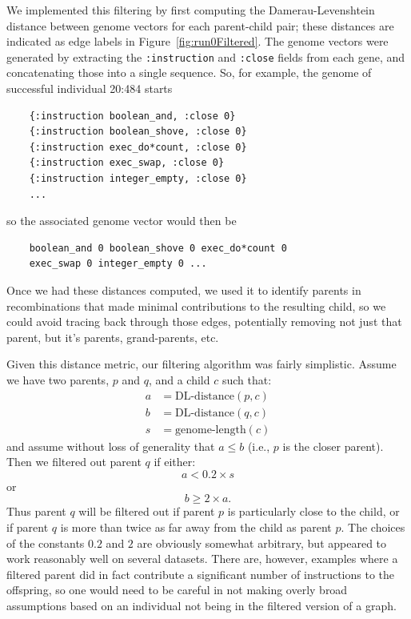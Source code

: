 We implemented this filtering by first computing the Damerau-Levenshtein 
distance between genome vectors for each parent-child pair; these distances
are indicated as edge labels in Figure~\ref{fig:run0Filtered}. The genome
vectors were generated by extracting the \texttt{:instruction} and 
\texttt{:close} fields from each gene, and concatenating those into a
single sequence. So, for example, the genome of successful individual
20:484 starts

\begin{verbatim}
	{:instruction boolean_and, :close 0} 
	{:instruction boolean_shove, :close 0} 
	{:instruction exec_do*count, :close 0} 
	{:instruction exec_swap, :close 0} 
	{:instruction integer_empty, :close 0}
	...
\end{verbatim}

so the associated genome vector would then be

\begin{verbatim}
	boolean_and 0 boolean_shove 0 exec_do*count 0 
	exec_swap 0 integer_empty 0 ...
\end{verbatim}

Once we had these distances computed, we used it to identify parents in
recombinations that made minimal contributions to the resulting child, so
we could avoid tracing back through those edges, potentially removing not
just that parent, but it's parents, grand-parents, etc. 

Given this distance metric, our filtering algorithm was fairly simplistic.
Assume we have two parents, $p$ and $q$, and a child $c$ such that:
\begin{align*}
	a & = \textrm{DL-distance}(p, c) \\
	b & = \textrm{DL-distance}(q, c) \\
	s & = \textrm{genome-length}(c)
\end{align*}
and assume without loss of generality that $a \leq b$ (i.e., $p$ is the
closer parent). Then we filtered out parent $q$ if either:
\[
	a < 0.2 \times s
\]
or
\[
	b \geq 2 \times a.
\]
Thus parent $q$ will be filtered out if parent $p$ is particularly close to
the child, or if parent $q$ is more than twice as far away from the child as
parent $p$. The choices of the constants $0.2$ and $2$ are obviously somewhat
arbitrary, but appeared to work reasonably well on several datasets. There are,
however, examples where a filtered parent did in fact contribute a significant
number of instructions to the offspring, so one would need to be careful in not
making overly broad assumptions based on an individual not being in the filtered
version of a graph.

